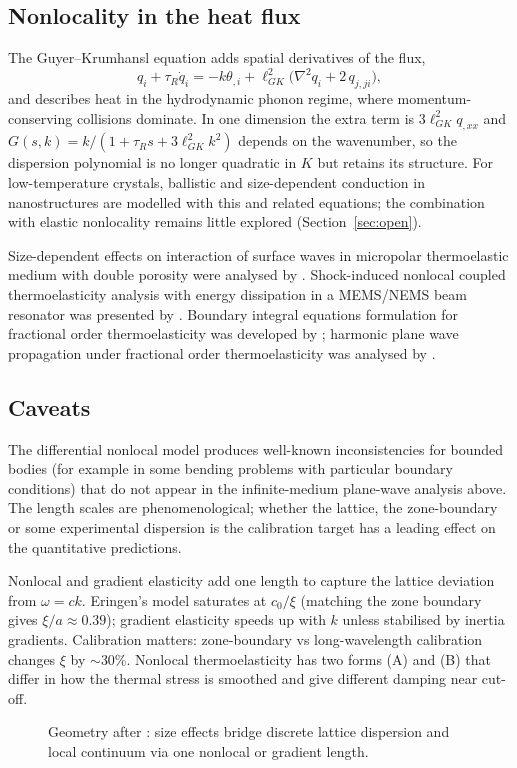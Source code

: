 \subsection{Nonlocality in the heat flux}
The Guyer--Krumhansl equation \citep{GuyerKrumhansl1966,GuyerKrumhansl1966II} adds spatial derivatives of the flux,
\begin{equation}
q_i+\tau_R\dot q_i=-k\theta_{,i}+\ell_{GK}^2\bigl(\nabla^2q_i+2\,q_{j,ji}\bigr),
\end{equation}
and describes heat in the hydrodynamic phonon regime, where momentum-conserving collisions dominate. In one dimension the extra term is $3\ell_{GK}^2q_{,xx}$ and $G(s,k)=k/(1+\tau_Rs+3\ell_{GK}^2k^2)$ depends on the wavenumber, so the dispersion polynomial is no longer quadratic in $K$ but retains its structure. For low-temperature crystals, ballistic and size-dependent conduction in nanostructures are modelled with this and related equations; the combination with elastic nonlocality remains little explored (Section~\ref{sec:open}).

Size-dependent effects on interaction of surface waves in micropolar thermoelastic medium with double porosity were analysed by \citep{Das2024}. Shock-induced nonlocal coupled thermoelasticity analysis with energy dissipation in a MEMS/NEMS beam resonator was presented by \citep{Hosseini2017}. Boundary integral equations formulation for fractional order thermoelasticity was developed by \citep{Tiwari2014}; harmonic plane wave propagation under fractional order thermoelasticity was analysed by \citep{Tiwari2015}.

\subsection{Caveats}
The differential nonlocal model produces well-known inconsistencies for bounded bodies (for example in some bending problems with particular boundary conditions) that do not appear in the infinite-medium plane-wave analysis above. The length scales are phenomenological; whether the lattice, the zone-boundary or some experimental dispersion is the calibration target has a leading effect on the quantitative predictions.

\begin{summarybox}[Summary]
Nonlocal and gradient elasticity add one length to capture the lattice deviation from $\omega=ck$. Eringen's model saturates at $c_0/\xi$ (matching the zone boundary gives $\xi/a\approx0.39$); gradient elasticity speeds up with $k$ unless stabilised by inertia gradients. Calibration matters: zone-boundary vs long-wavelength calibration changes $\xi$ by $\sim$30\%. Nonlocal thermoelasticity has two forms (A) and (B) that differ in how the thermal stress is smoothed and give different damping near cut-off.
\end{summarybox}

\begin{figure}[t!]\centering\small

\caption{Geometry after \citep{BornKarman1912,Eringen1972}: size effects bridge discrete lattice dispersion and local continuum via one nonlocal or gradient length.}\label{fig:size-geo}
\end{figure}
